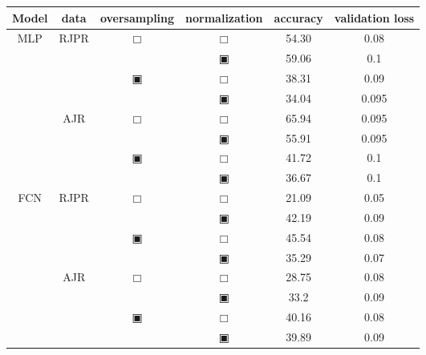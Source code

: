 \begin{table}[H]
	\renewcommand{\arraystretch}{.75}
	\begin{tabular}{|c|c|c|c|c|c|}
		\hline
		Model & data & oversampling & normalization & accuracy & validation loss\\
		\hline\hline
		\multirow{8}{*}{MLP}& \multirow{4}{*}{ RJPR } & \multirow{2}{*}{$\Box$} & $\Box$ & 54.30 & 0.08\\\cline{4-6}
				    &                    &                         & $\blackinwhitesquare$ & 59.06 & 0.1\\\cline{3-6}
				    &                    & \multirow{2}{*}{$\blackinwhitesquare$} & $\Box$ & 38.31 & 0.09\\\cline{4-6}
				    &                    &                         & $\blackinwhitesquare$ & 34.04 & 0.095\\\cline{2-6}
				    & \multirow{4}{*}{ AJR } & \multirow{2}{*}{$\Box$} & $\Box$ & 65.94 & 0.095\\\cline{4-6}
				    &                     &                         & $\blackinwhitesquare$ & 55.91 & 0.095\\\cline{3-6}
				    &                     & \multirow{2}{*}{$\blackinwhitesquare$} & $\Box$ & 41.72 & 0.1\\\cline{4-6}
				    &                     &                         & $\blackinwhitesquare$ & 36.67 & 0.1\\\cline{2-6}
		\hline\hline
		\multirow{8}{*}{FCN}& \multirow{4}{*}{ RJPR } & \multirow{2}{*}{$\Box$} & $\Box$ & 21.09 & 0.05\\\cline{4-6}
				    &                    &                         & $\blackinwhitesquare$ & 42.19 & 0.09\\\cline{3-6}
				    &                    & \multirow{2}{*}{$\blackinwhitesquare$} & $\Box$ & 45.54 & 0.08\\\cline{4-6}
				    &                    &                         & $\blackinwhitesquare$ & 35.29 & 0.07\\\cline{2-6}
				    & \multirow{4}{*}{ AJR } & \multirow{2}{*}{$\Box$} & $\Box$ & 28.75 & 0.08\\\cline{4-6}
				    &                     &                         & $\blackinwhitesquare$ & 33.2 & 0.09\\\cline{3-6}
				    &                     & \multirow{2}{*}{$\blackinwhitesquare$} & $\Box$ & 40.16 & 0.08\\\cline{4-6}
				    &                     &                         & $\blackinwhitesquare$ & 39.89 & 0.09\\\cline{2-6}

\end{tabular}
\end{table}
